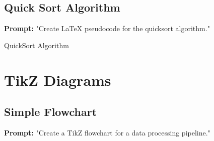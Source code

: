 \documentclass[12pt, a4paper]{article}
\begin{document}
\subsection{Quick Sort Algorithm}

\textbf{Prompt:} "Create LaTeX pseudocode for the quicksort algorithm."

\begin{algorithm}[h]
    \caption{QuickSort Algorithm}
    \label{alg:quicksort}
    
    
    
\end{algorithm}

\section{TikZ Diagrams}

\subsection{Simple Flowchart}

\textbf{Prompt:} "Create a TikZ flowchart for a data processing pipeline."
\end{document}
